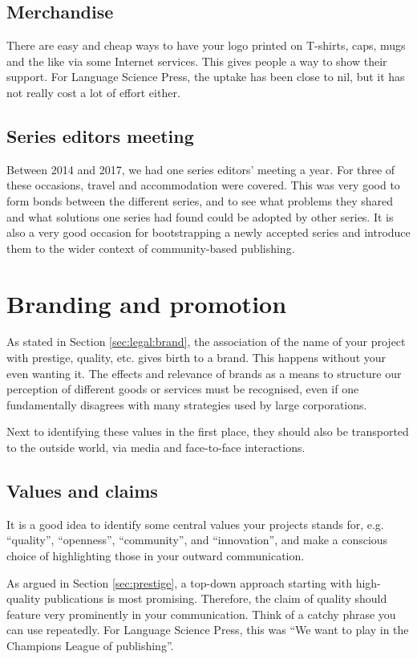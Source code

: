 \documentclass[nonflat,smallfont
]{langsci/langscibook}
\begin{document}
\subsection{Merchandise}
There are easy and cheap ways to have your logo printed on T-shirts, caps, mugs and the like via some Internet services. This gives people a way to show their support. For Language Science Press, the uptake has been close to nil, but it has not really cost a lot of effort either. 

\subsection{Series editors meeting}  
Between 2014 and 2017, we had one series editors' meeting a year. For three of these occasions, travel and accommodation were covered. This was very good to form bonds between the different series, and to see what problems they shared and what solutions one series had found could be adopted by other series. It is also a very good occasion for bootstrapping a newly accepted series and introduce them to the wider context of community-based publishing. 

\section{Branding and promotion}\label{sec:branding}
As stated in Section \ref{sec:legal:brand}, the association of the name of your project with prestige, quality, etc. gives birth to a brand. This happens without your even wanting it. The effects and relevance of brands as a means to structure our perception of different goods or services must be  recognised, even if one  fundamentally disagrees with many strategies used by large corporations. 

Next to identifying these values in the first place, they should also be transported to the outside world, via media and face-to-face interactions. 

\subsection{Values and claims}
It is a good idea to identify some central values your projects stands for, e.g. ``quality'', ``openness'', ``community'', and ``innovation'', and make a conscious choice of highlighting those in your outward communication. 

As argued in Section \ref{sec:prestige}, a top-down approach starting with high-quality publications is most promising. Therefore, the claim of quality should feature very prominently in your communication. Think of a catchy phrase you can use repeatedly. For Language Science Press, this was ``We want to play in the Champions League of publishing''. 
\end{document}
